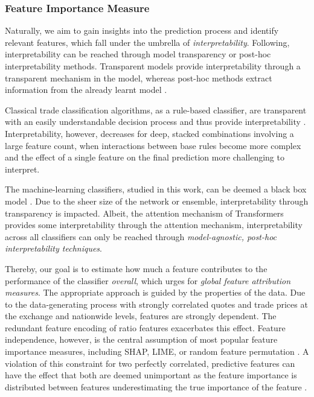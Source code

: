 
\subsubsection{Feature Importance
    Measure}\label{sec:feature-importance-measure}

Naturally, we aim to gain insights into the prediction process and identify relevant features, which fall under the umbrella of \emph{interpretability}.
Following, \textcite[][4]{liptonMythosModelInterpretability2017} interpretability can be reached through model transparency or post-hoc interpretability methods. Transparent models provide interpretability through a transparent mechanism in the model, whereas post-hoc methods extract information from the already learnt model \autocite[][4--5]{liptonMythosModelInterpretability2017}.

Classical trade classification algorithms, as a rule-based classifier, are transparent with an easily understandable decision process and thus provide interpretability \autocite[][91]{barredoarrietaExplainableArtificialIntelligence2020}. Interpretability, however, decreases for deep, stacked combinations involving a large feature count, when interactions between base rules become more complex and the effect of a single feature on the final prediction more challenging to interpret.

The machine-learning classifiers, studied in this work, can be deemed a black box model \autocite[][90]{barredoarrietaExplainableArtificialIntelligence2020}. Due to the sheer size of the network or ensemble, interpretability through transparency is impacted. Albeit, the attention mechanism of Transformers provides some interpretability through the attention mechanism,  interpretability across all classifiers can only be reached through \emph{model-agnostic, post-hoc interpretability techniques}.

Thereby, our goal is to estimate how much a feature contributes to the performance of the classifier \emph{overall}, which urges for \emph{global feature attribution measures}. The appropriate approach is guided by the properties of the data. Due to the data-generating process with strongly correlated quotes and trade prices at the exchange and nationwide levels, features are strongly dependent. The redundant feature encoding of ratio features exacerbates this effect. Feature independence, however, is the central assumption of most popular feature importance measures, including \gls{SHAP}, \gls{LIME}, or random feature permutation \autocite[][2]{aasExplainingIndividualPredictions2021}. A violation of this constraint for two perfectly correlated, predictive features can have the effect that both are deemed unimportant as the feature importance is distributed between features underestimating the true importance of the feature \autocite[][4]{covertUnderstandingGlobalFeature2020}.

